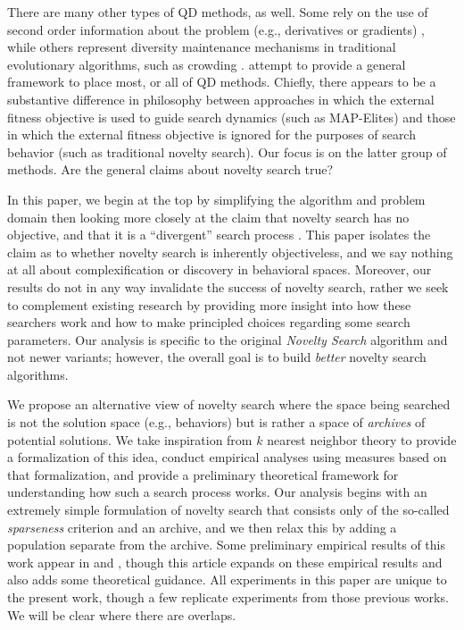 \documentclass[twoside]{article}
\begin{document}
There are many other types of QD methods, as well.  Some rely on the use of second order information about the problem (e.g., derivatives or gradients) \citep{Fontaine2021corr}, while others represent diversity maintenance mechanisms in traditional evolutionary algorithms, such as crowding \citep{Goldberg1987icga}.  \citet{CullyDemiris2017corr} attempt to provide a general framework to place most, or all of QD methods.  Chiefly, there appears to be a substantive difference in philosophy between approaches in which the external fitness objective is used to guide search dynamics (such as MAP-Elites) and those in which the external fitness objective is ignored for the purposes of search behavior (such as traditional novelty search).  Our focus is on the latter group of methods.  Are the general claims about novelty search true? 

In this paper, we begin at the top by simplifying the algorithm and problem domain then looking more closely at the claim that novelty search has no objective, and that it is a ``divergent'' search process \citep{Lehman2016frai,Lehman2015gecco,StanleyLehman2015}.  This paper isolates the claim as to whether novelty search is inherently objectiveless, and we say nothing at all about complexification or discovery in behavioral spaces.  Moreover, our results do not in any way invalidate the success of novelty search, rather we seek to complement existing research by providing more insight into how these searchers work and how to make principled choices regarding some search parameters.  Our analysis is specific to the original \emph{Novelty Search} algorithm and not newer variants; however, the overall goal is to build \emph{better} novelty search algorithms.

We propose an alternative view of novelty search where the space being searched is not the solution space (e.g., behaviors) but is rather a space of \emph{archives} of potential solutions.  We take inspiration from $k$ nearest neighbor theory to provide a formalization of this idea, conduct empirical analyses using measures based on that formalization, and provide a preliminary theoretical framework for understanding how such a search process works.  Our analysis begins with an extremely simple formulation of novelty search that consists only of the so-called \emph{sparseness} criterion and an archive, and we then relax this by adding a population separate from the archive.  Some preliminary empirical results of this work appear in \citet{Wiegand2020flairs} and \citet{Wiegand2021flairs}, though this article expands on these empirical results and also adds some theoretical guidance.  All experiments in this paper are unique to the present work, though a few replicate experiments from those previous works.  We will be clear where there are overlaps.
\end{document}
